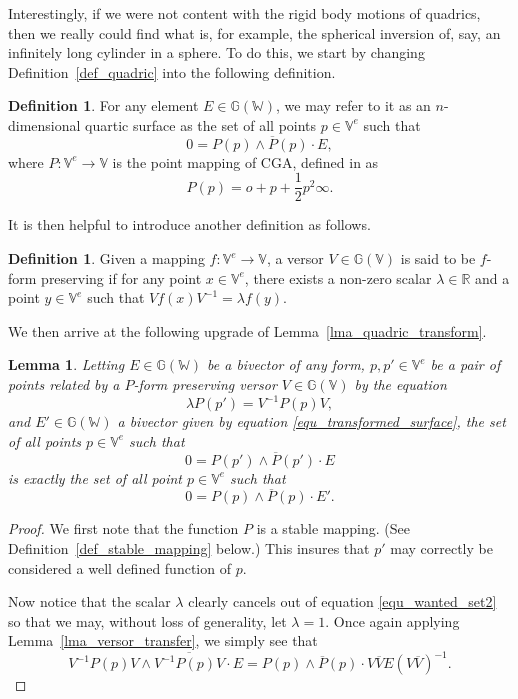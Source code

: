 \documentclass{birkjour}
\newtheorem{lem}[thm]{Lemma}
\theoremstyle{definition}
\newtheorem{defn}[thm]{Definition}
\theoremstyle{remark}
\numberwithin{equation}{section}
\newcommand{\G}{\mathbb{G}}
\newcommand{\V}{\mathbb{V}}
\newcommand{\W}{\mathbb{W}}
\newcommand{\R}{\mathbb{R}}
\newcommand{\nvao}{o}
\newcommand{\nvai}{\infty}
\begin{document}
Interestingly, if we were not content with the rigid body motions of
quadrics, then we really could find what is, for example, the spherical
inversion of, say, an infinitely long cylinder in a sphere.  To do this, we start by changing
Definition~\ref{def_quadric} into the following definition.
\begin{defn}\label{def_surface}
For any element $E\in\G(\W)$, we may refer to it as an $n$-dimensional
quartic surface as the set of all points $p\in\V^e$ such that
\begin{equation}\label{equ_surface_set}
0 = P(p)\wedge\overline{P}(p)\cdot E,
\end{equation}
where $P:\V^e\to\V$ is the point mapping of CGA, defined in \cite{Hestenes01} as
\begin{equation}\label{equ_cga_point_map}
P(p) = \nvao + p + \frac{1}{2}p^2\nvai.
\end{equation}
\end{defn}
It is then helpful to introduce another definition as follows.
\begin{defn}\label{def_preserve_point_map}
Given a mapping $f:\V^e\to\V$, a versor $V\in\G(\V)$ is said to be $f$-form preserving if for
any point $x\in\V^e$, there exists a non-zero scalar $\lambda\in\R$ and
a point $y\in\V^e$ such that $Vf(x)V^{-1}=\lambda f(y)$.
\end{defn}
We then arrive at the following upgrade of Lemma~\ref{lma_quadric_transform}.
\begin{lem}\label{lma_quartic_transform}
Letting $E\in\G(\W)$ be a bivector of any form, $p,p'\in\V^e$ be
a pair of points related by a $P$-form preserving versor $V\in\G(\V)$ by
the equation
\begin{equation}
\lambda P(p') = V^{-1}P(p)V,
\end{equation}
and $E'\in\G(\W)$ a bivector given by equation \eqref{equ_transformed_surface},
the set of all points $p\in\V^e$ such that
\begin{equation}\label{equ_wanted_set2}
0 = P(p')\wedge\overline{P}(p')\cdot E
\end{equation}
is exactly the set of all point $p\in\V^e$ such that
\begin{equation}
0 = P(p)\wedge\overline{P}(p)\cdot E'.
\end{equation}
\end{lem}
\begin{proof}
We first note that the function $P$ is a stable mapping.  (See Definition~\ref{def_stable_mapping} below.)
This insures that $p'$ may correctly be considered a well defined function of $p$.

Now notice that the scalar $\lambda$ clearly cancels out of equation \eqref{equ_wanted_set2} so that we may,
without loss of generality, let $\lambda=1$.
Once again applying Lemma~\ref{lma_versor_transfer}, we simply see that
\begin{equation}
V^{-1}P(p)V\wedge\overline{V^{-1}P(p)V}\cdot E = P(p)\wedge\overline{P}(p)\cdot V\overline{V}E(V\overline{V})^{-1}.
\end{equation}
\end{proof}
\end{document}
